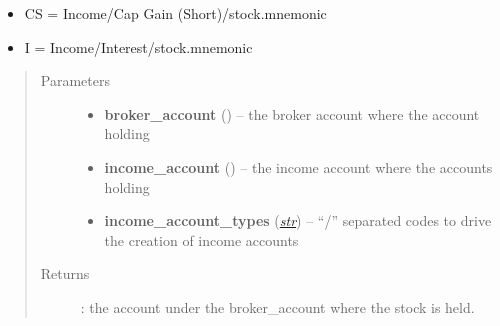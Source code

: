 \documentclass[letterpaper,10pt,english]{sphinxmanual}
\begin{document}
\begin{fulllineitems}
\begin{fulllineitems}
\begin{itemize}
\item {} 
CS = Income/Cap Gain (Short)/stock.mnemonic

\item {} 
I = Income/Interest/stock.mnemonic

\end{itemize}
\begin{quote}\begin{description}
\item[{Parameters}] \leavevmode\begin{itemize}
\item {} 
\textbf{broker\_account} ({\hyperref[api/piecash.model_core.account:piecash.model_core.account.Account]{}}) -- the broker account where the account holding

\item {} 
\textbf{income\_account} ({\hyperref[api/piecash.model_core.account:piecash.model_core.account.Account]{}}) -- the income account where the accounts holding

\item {} 
\textbf{income\_account\_types} (\href{http://docs.python.org/library/functions.html\#str}{\emph{str}}) -- ``/'' separated codes to drive the creation of income accounts

\end{itemize}

\item[{Returns}] \leavevmode
{\hyperref[api/piecash.model_core.account:piecash.model_core.account.Account]{}}: the account under the broker\_account where the stock is held.

\end{description}\end{quote}

\end{fulllineitems}


\end{fulllineitems}

\end{document}
